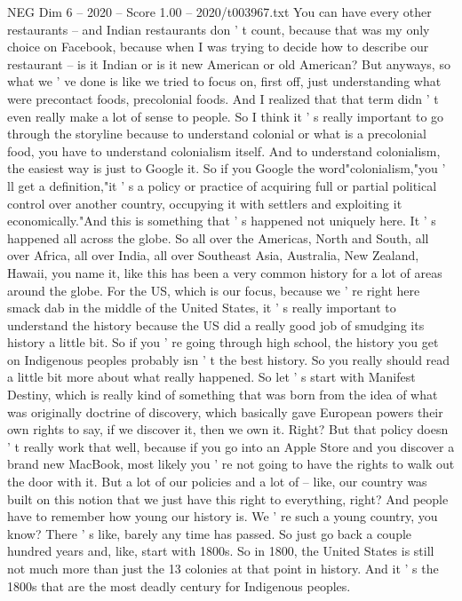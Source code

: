 \begin{textsample}{NEG Dim 6 – 2020 – Score 1.00 – 2020/t003967.txt}
You can have every other restaurants -- and Indian restaurants don ' t count, because that was my only choice on Facebook, because when I was trying to decide how to describe our restaurant -- is it Indian or is it new American or old American?
But anyways, so what we ' ve done is like we tried to focus on, first off, just understanding what were precontact foods, precolonial foods.
And I realized that that term didn ' t even really make a lot of sense to people.
So I think it ' s really important to go through the storyline because to understand colonial or what is a precolonial food, you have to understand colonialism itself.
And to understand colonialism, the easiest way is just to Google it.
So if you Google the word"colonialism,"you ' ll get a definition,"it ' s a policy or practice of acquiring full or partial political control over another country, occupying it with settlers and exploiting it economically."And this is something that ' s happened not uniquely here.
It ' s happened all across the globe.
So all over the Americas, North and South, all over Africa, all over India, all over Southeast Asia, Australia, New Zealand, Hawaii, you name it, like this has been a very common history for a lot of areas around the globe.
For the US, which is our focus, because we ' re right here smack dab in the middle of the United States, it ' s really important to understand the history because the US did a really good job of smudging its history a little bit.
So if you ' re going through high school, the history you get on Indigenous peoples probably isn ' t the best history.
So you really should read a little bit more about what really happened.
So let ' s start with Manifest Destiny, which is really kind of something that was born from the idea of what was originally doctrine of discovery, which basically gave European powers their own rights to say, if we discover it, then we own it.
Right?
But that policy doesn ' t really work that well, because if you go into an Apple Store and you discover a brand new MacBook, most likely you ' re not going to have the rights to walk out the door with it.
But a lot of our policies and a lot of -- like, our country was built on this notion that we just have this right to everything, right?
And people have to remember how young our history is.
We ' re such a young country, you know?
There ' s like, barely any time has passed.
So just go back a couple hundred years and, like, start with 1800s.
So in 1800, the United States is still not much more than just the 13 colonies at that point in history.
And it ' s the 1800s that are the most deadly century for Indigenous peoples.

\end{textsample}
